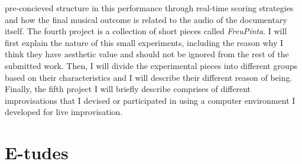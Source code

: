 pre-concieved structure in this performance through real-time scoring strategies and how the final musical outcome is related to the audio of the documentary itself. The fourth project is a collection of short pieces called \emph{FreuPinta}. I will first explain the nature of this small experiments, including the reason why I think they have aesthetic value and should not be ignored from the rest of the submitted work. Then, I will divide the experimental pieces into different groups based on their characteristics and I will describe their different reason of being. Finally, the fifth project I will briefly describe comprises of different improvisations that I devised or participated in using a computer environment I developed for live improvisation.

\section{E-tudes}

